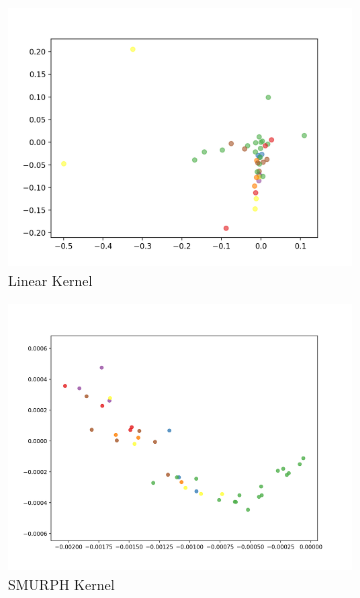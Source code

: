 \documentclass[10pt]{article}
\begin{document}
\begin{figure}[H]
    \centering
    \begin{subfigure}[H]{0.28\textwidth}
        \includegraphics[width=\linewidth]{DB_linear}
        \caption{Linear Kernel}
    \end{subfigure}
    \begin{subfigure}[h]{0.28\textwidth}
        \includegraphics[width=\linewidth]{DB_smurf}
        \caption{SMURPH Kernel}
    \end{subfigure}%
    \begin{subfigure}[h]{0.28\textwidth}

\end{subfigure}
\end{figure}
\end{document}
